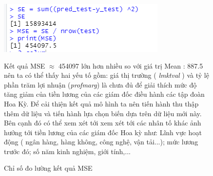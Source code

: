 \begin{figure}[h!]
	\centering
	\includegraphics[width=.5\linewidth]{../Photo Of Result/B1_MSE.PNG}  
	\caption{Chỉ số đo lường kết quả MSE}
	\label{fig-b1:mse}

Kết quả MSE $\approx$ 454097 lớn hơn nhiều so với giá trị Mean : 887.5 nên ta có thể thấy hai yếu tố gồm: giá thị trường ( \textit{lmktval} ) và tỷ lệ phần trăm lợi nhuận (\textit{profmarg}) là chưa đủ để giải thích mức độ tăng giảm của tiền lương của các giám đốc điều hành các tập đoàn Hoa Kỳ. Để cải thiện kết quả mô hình ta nên tiến hành thu thập thêm dữ liệu và tiến hành lựa chọn biến dựa trên dữ liệu mới này. Bên cạnh đó có thể xem xét tới xem xét tới các nhân tố khác ảnh hưởng tới tiền lương của các giám đốc Hoa kỳ như: Lĩnh vực hoạt động ( ngân hàng, hàng không, công nghệ, vận tải...); mức lương trước đó; số năm kinh nghiệm, giới tính,...
	

\end{figure}










